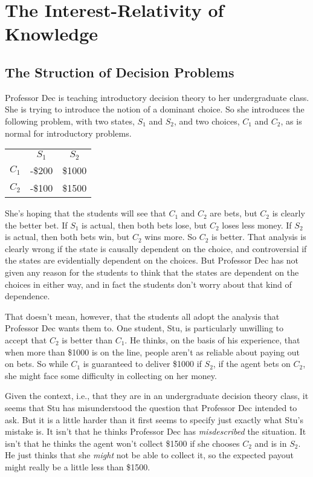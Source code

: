 \documentclass[11pt,oneside]{book}
\begin{document}
\section{The Interest-Relativity of Knowledge}

\subsection{The Struction of Decision Problems}

Professor Dec is teaching introductory decision theory to her undergraduate class. She is trying to introduce the notion of a dominant choice. So she introduces the following problem, with two states, $S_1$ and $S_2$, and two choices, $C_1$ and $C_2$, as is normal for introductory problems.

\begin{center}
\begin{tabular}{r c c}
 & $S_1$ & $S_2$ \\
$C_1$ & -\$200 & \$1000 \\
$C_2$ & -\$100 & \$1500 
\end{tabular}
\end{center}

\noindent She's hoping that the students will see that $C_1$ and $C_2$ are bets, but $C_2$ is clearly the better bet. If $S_1$ is actual, then both bets lose, but $C_2$ loses less money. If $S_2$ is actual, then both bets win, but $C_2$ wins more. So $C_2$ is better. That analysis is clearly wrong if the state is causally dependent on the choice, and controversial if the states are evidentially dependent on the choices. But Professor Dec has not given any reason for the students to think that the states are dependent on the choices in either way, and in fact the students don't worry about that kind of dependence.

That doesn't mean, however, that the students all adopt the analysis that Professor Dec wants them to. One student, Stu, is particularly unwilling to accept that $C_2$ is better than $C_1$. He thinks, on the basis of his experience, that when more than \$1000 is on the line, people aren't as reliable about paying out on bets. So while $C_1$ is guaranteed to deliver \$1000 if $S_2$, if the agent bets on $C_2$, she might face some difficulty in collecting on her money.

Given the context, i.e., that they are in an undergraduate decision theory class, it seems that Stu has misunderstood the question that Professor Dec intended to ask. But it is a little harder than it first seems to specify just exactly what Stu's mistake is. It isn't that he thinks Professor Dec has \textit{misdescribed} the situation. It isn't that he thinks the agent won't collect \$1500 if she chooses $C_2$ and is in $S_2$. He just thinks that she \textit{might} not be able to collect it, so the expected payout might really be a little less than \$1500.
\end{document}
